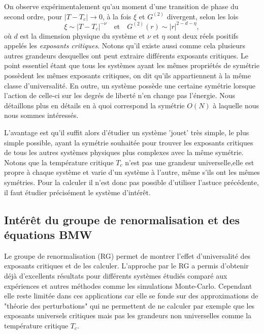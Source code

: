 \documentclass[10pt]{article}
\begin{document}
\begin{multicols}{2}
On observe expérimentalement qu'au moment d'une transition de phase du second ordre, pour $|T-T_c| \rightarrow 0$, à la fois $\xi$ et $G^{(2)}$ divergent, selon les lois 
\begin{equation}
	\xi \sim |T-T_c|^{-\nu} 	\quad \text{et} \quad G^{(2)}(r) \sim |r|^{2-d-\eta},
\end{equation}
où $d$ est la dimension physique du système et $\nu$ et $\eta$ sont deux réels positifs appelés les \emph{exposants critiques}. Notons qu'il existe aussi comme cela plusieurs autres grandeurs desquelles ont peut extraire différents exposants critiques. Le point essentiel étant que tous les systèmes ayant les mêmes propriétés de symétrie possèdent les mêmes exposants critiques, on dit qu'ils appartiennent à la même classe d'universalité. En outre, un système possède une certaine symétrie lorsque l'action de celle-ci sur les degrés de liberté n'en change pas l'énergie. Nous détaillons plus en détails en  à quoi correspond la symétrie $O(N)$ à laquelle nous nous sommes intéressés. 

L'avantage est qu'il suffit alors d'étudier un système 'jouet' très simple, le plus simple possible, ayant la symétrie souhaitée pour trouver les exposants critiques de tous les autres systèmes physiques plus complexes avec la même symétrie. Notons que la température critique $T_c$ n'est pas une grandeur universelle,elle est propre à chaque système et varie d'un système à l'autre, même s'ils ont les mêmes symétries. Pour la calculer il n'est donc pas possible d'utiliser l'astuce précédente, il faut étudier précisément le système d'intérêt.


\subsection{Intérêt du groupe de renormalisation et des équations BMW}

Le groupe de renormalisation (RG) permet de montrer l'effet d'universalité des exposants critiques et de les calculer. L'approche par le RG a permis d'obtenir déjà d'excellents résultats \cite{kadanoff1967scaling, wilson1971renormalization2} pour différents systèmes étudiés comparé aux expériences et autres méthodes comme les simulations Monte-Carlo. Cependant elle reste limitée dans ces applications car elle se fonde sur des approximations de "théorie des perturbations" qui ne permettent de ne calculer par exemple que les exposants universels critiques mais pas les grandeurs non universelles comme la température critique $T_c$.\\


\end{multicols}
\end{document}
